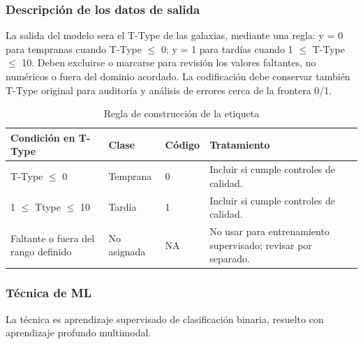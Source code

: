 \documentclass[12pt]{article}
\begin{document}
\subsubsection{Descripción de los datos de salida}

La salida del modelo sera el T-Type de las galaxias, mediante una regla: y = 0 para tempranas cuando T-Type $\leq$ 0; y = 1 para tardías cuando 1 $\leq$ T-Type $\leq$ 10. Deben excluirse o marcarse para revisión los valores faltantes, no numéricos o fuera del dominio acordado. La codificación debe conservar también T-Type original para auditoría y análisis de errores cerca de la frontera 0/1.

\begin{table}[H]
\centering
\scriptsize
\begin{tabular}{|p{}|p{}|p{}|p{}|} \hline
\textbf{Condición en T-Type} & \textbf{Clase} & \textbf{Código} & \textbf{Tratamiento} \\ \hline

T-Type $\leq$  0 &
Temprana &
0 &
Incluir si cumple controles de calidad. \\ \hline

1 $\leq$ Ttype $\leq$ 10 &
Tardía &
1 &
Incluir si cumple controles de calidad. \\ \hline

Faltante o fuera del rango definido &
No asignada &
NA &
No usar para entrenamiento supervisado; revisar por separado. \\ \hline

\end{tabular}
\caption{Regla de construcción de la etiqueta}
\label{etiquetas}
\end{table}

\subsubsection{Técnica de ML}

La técnica es aprendizaje supervisado de clasificación binaria, resuelto con aprendizaje profundo multimodal.
\end{document}

